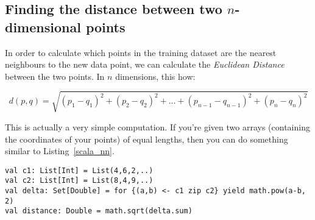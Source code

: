 \subsection{Finding the distance between two $n$-dimensional points}

In order to calculate which points in the training dataset are the nearest
neighbours to the new data point, we can calculate the {\it Euclidean Distance}
between the two points. In $n$ dimensions, this how:

\[
  d(p,q) = \sqrt{(p_1 - q_1)^2 + (p_2 - q_2)^2 + \dots + (p_{n-1} - q_{n-1})^2 + (p_n - q_n)^2}
\]

This is actually a very simple computation. If you're given two arrays
(containing the coordinates of your points) of equal lengths, then you can do
something similar to Listing~\ref{scala_nn}.

\begin{lstlisting}[label=scala_nn, caption=Scala Nearest Neighbour]
val c1: List[Int] = List(4,6,2,..)
val c2: List[Int] = List(8,4,9,..)
val delta: Set[Double] = for {(a,b) <- c1 zip c2} yield math.pow(a-b, 2)
val distance: Double = math.sqrt(delta.sum)
\end{lstlisting}